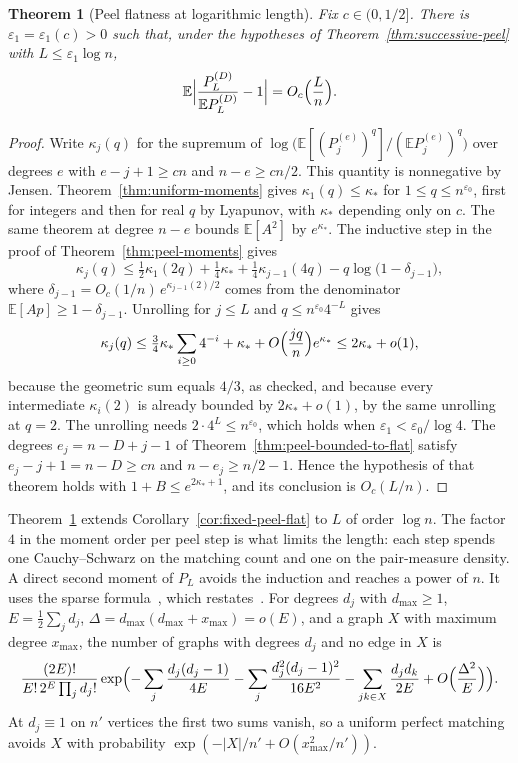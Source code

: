 \documentclass[11pt]{article}
\newtheorem{theorem}{Theorem}
\newcommand{\EE}{\mathbb{E}}
\begin{document}
\begin{theorem}[Peel flatness at logarithmic length]
\label{thm:log-peel-flat}
Fix \(c\in(0,1/2]\).
There is \(\varepsilon_1=\varepsilon_1(c)>0\) such that, under the hypotheses
of Theorem~\ref{thm:successive-peel} with \(L\le\varepsilon_1\log n\),
\[
\EE\Bigl|\frac{P_L^{(D)}}{\EE P_L^{(D)}}-1\Bigr|=O_c\Bigl(\frac Ln\Bigr).
\]
\end{theorem}

\begin{proof}
Write \(\kappa_j(q)\) for the supremum of
\(\log\bigl(\EE[(P_j^{(e)})^q]/(\EE P_j^{(e)})^q\bigr)\) over degrees \(e\) with
\(e-j+1\ge cn\) and \(n-e\ge cn/2\). This quantity is nonnegative by Jensen.
Theorem~\ref{thm:uniform-moments} gives \(\kappa_1(q)\le\kappa_*\) for
\(1\le q\le n^{\varepsilon_0}\), first for integers and then for real
\(q\) by Lyapunov, with \(\kappa_*\) depending only on \(c\).
The same theorem at degree \(n-e\) bounds \(\EE[A^2]\) by \(e^{\kappa_*}\).
The inductive step in the proof of Theorem~\ref{thm:peel-moments} gives
\[
\kappa_j(q)\le\tfrac12\kappa_1(2q)+\tfrac14\kappa_*+\tfrac14\kappa_{j-1}(4q)
-q\log\bigl(1-\delta_{j-1}\bigr),
\]
where \(\delta_{j-1}=O_c(1/n)\,e^{\kappa_{j-1}(2)/2}\) comes from the
denominator \(\EE[Ap]\ge1-\delta_{j-1}\).
Unrolling for \(j\le L\) and \(q\le n^{\varepsilon_0}4^{-L}\) gives
\[
\kappa_j(q)\le\tfrac34\kappa_*\sum_{i\ge0}4^{-i}+\kappa_*+O\Bigl(\frac{jq}{n}\Bigr)e^{\kappa_*}
\le2\kappa_*+o(1),
\]
because the geometric sum equals \(4/3\), as checked, and because every
intermediate \(\kappa_{i}(2)\) is already bounded by \(2\kappa_*+o(1)\),
by the same unrolling at \(q=2\).
The unrolling needs \(2\cdot4^{L}\le n^{\varepsilon_0}\), which holds when
\(\varepsilon_1<\varepsilon_0/\log 4\).
The degrees \(e_j=n-D+j-1\) of Theorem~\ref{thm:peel-bounded-to-flat} satisfy
\(e_j-j+1=n-D\ge cn\) and \(n-e_j\ge n/2-1\).
Hence the hypothesis of that theorem holds with \(1+B\le e^{2\kappa_*+1}\), and
its conclusion is \(O_c(L/n)\).
\end{proof}

Theorem~\ref{thm:log-peel-flat} extends Corollary~\ref{cor:fixed-peel-flat}
to \(L\) of order \(\log n\).
The factor \(4\) in the moment order per peel step is what limits the length:
each step spends one Cauchy--Schwarz on the matching count and one on the
pair-measure density.
A direct second moment of \(P_L\) avoids the induction and reaches a power
of \(n\).
It uses the sparse formula~\cite[Theorem~1]{McK11}, which restates~\cite{McK85}.
For degrees \(d_j\) with \(d_{\max}\ge1\), \(E=\frac12\sum_jd_j\),
\(\Delta=d_{\max}(d_{\max}+x_{\max})=o(E)\), and a graph \(X\) with maximum
degree \(x_{\max}\), the number of graphs with degrees \(d_j\) and no edge in
\(X\) is
\[
\frac{(2E)!}{E!\,2^E\prod_jd_j!}
\exp\Bigl(-\sum_j\frac{d_j(d_j-1)}{4E}-\sum_j\frac{d_j^2(d_j-1)^2}{16E^2}
-\sum_{jk\in X}\frac{d_jd_k}{2E}+O\Bigl(\frac{\Delta^2}{E}\Bigr)\Bigr).
\]
At \(d_j\equiv1\) on \(n'\) vertices the first two sums vanish, so a uniform
perfect matching avoids \(X\) with probability
\(\exp(-|X|/n'+O(x_{\max}^2/n'))\).
\end{document}
